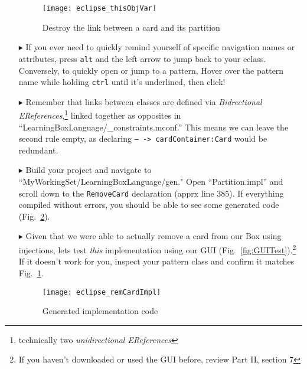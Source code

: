 \begin{itemize}
\vspace{0.5cm}

\begin{figure}[htp]
\begin{center}
  \texttt{[image: eclipse\_thisObjVar]}
  \caption{Destroy the link between a card and its partition}
  \label{fig:deleteReference}
\end{center}
\end{figure}

\item[$\blacktriangleright$] If you ever need to quickly remind yourself of specific navigation names or attributes, press \texttt{alt} and the left arrow to
jump back to your eclass. Conversely, to quickly open or jump to a pattern, Hover over the pattern name while holding \texttt{ctrl} until it's underlined,
then click!

\vspace{0.5cm}

\item[$\blacktriangleright$] Remember that links between classes are defined via \emph{Bidrectional EReferences},\footnote{technically two
\emph{unidirectional EReferences}} linked together as opposites in ``LearningBoxLanguage/\_con\-straints.mconf.'' This means we can leave the second rule empty,
as declaring \texttt{-- -> cardContainer:Card} would be redundant.

\vspace{0.5cm}

\item[$\blacktriangleright$] Build your project and navigate to ``MyWorkingSet/LearningBoxLanguage/gen." Open ``Partition.impl'' and scroll down to the
\texttt{RemoveCard} declaration (apprx line 385). If everything compiled without errors, you should be able to see some generated code
(Fig.~\ref{fig:remCardImpl}).

\vspace{0.5cm}

\item[$\blacktriangleright$] Given that we were able to actually remove a card from our Box using injections, lets test \emph{this} implementation using our GUI
(Fig.~\ref{fig:GUITest}).\footnote{ If you haven't downloaded or used the GUI before, review Part II, section 7} If it doesn't work for you, inspect your
pattern class and confirm it matches Fig.~\ref{fig:deleteReference}.

\clearpage

\begin{figure}[htp]
\begin{center}
  \texttt{[image: eclipse\_remCardImpl]}
  \caption{Generated implementation code}
  \label{fig:remCardImpl}
\end{center}
\end{figure}


\end{itemize}
